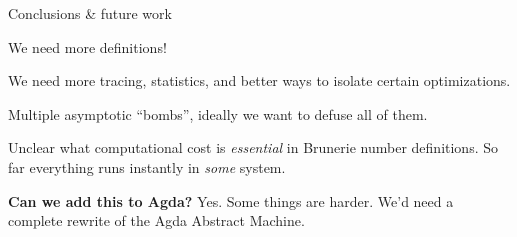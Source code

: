 \documentclass[dvipsnames]{beamer}
\begin{document}
\begin{frame}{Conclusions \& future work}

We need more definitions!
\vspace{1em}
\pause

We need more tracing, statistics, and better ways to isolate certain optimizations.
\vspace{1em}
\pause

Multiple asymptotic ``bombs'', ideally we want to defuse all of them.
\vspace{1em}
\pause

Unclear what computational cost is \emph{essential} in Brunerie number definitions.
So far everything runs instantly in \emph{some} system.
\vspace{1em}
\pause

\textbf{Can we add this to Agda?} Yes. Some things are harder. We'd need a complete
rewrite of the Agda Abstract Machine.
\end{frame}
\end{document}
